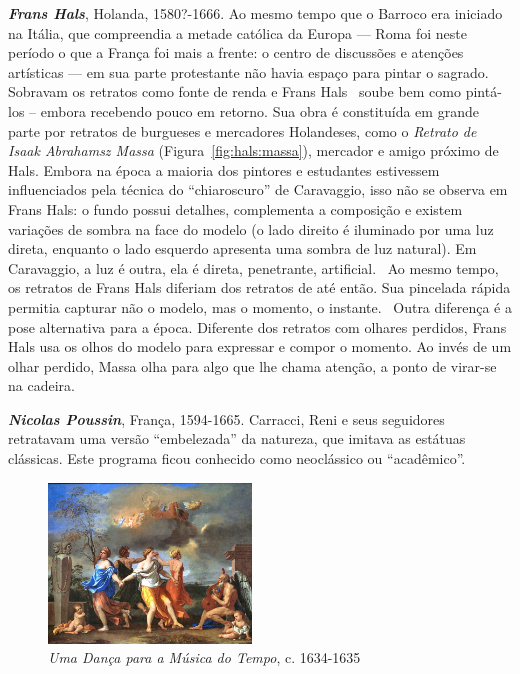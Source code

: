 \textbf{\emph{Frans Hals}}, Holanda, 1580?-1666. Ao mesmo tempo que o Barroco
era iniciado na Itália, que compreendia a metade católica da Europa --- Roma foi
neste período o que a França foi mais a frente: o centro de discussões e
atenções artísticas --- em sua parte protestante não havia espaço para pintar o
sagrado.~\cite{gombrich} Sobravam os retratos como fonte de renda e Frans
Hals~\cite{grimm} soube bem como pintá-los -- embora recebendo pouco em
retorno. Sua obra é constituída em grande parte por retratos de burgueses e
mercadores Holandeses, como o \textit{Retrato de Isaak Abrahamsz Massa}
(Figura~\ref{fig:hals:massa}), mercador e amigo próximo de Hals.  Embora na
época a maioria dos pintores e estudantes estivessem influenciados pela técnica
do ``chiaroscuro'' de Caravaggio, isso não se observa em Frans Hals: o fundo
possui detalhes, complementa a composição e existem variações de sombra na face
do modelo (o lado direito é iluminado por uma luz direta, enquanto o lado
esquerdo apresenta uma sombra de luz natural). Em Caravaggio, a luz é outra, ela
é direta, penetrante, artificial.~\cite{gombrich} Ao mesmo tempo, os retratos de
Frans Hals diferiam dos retratos de até então. Sua pincelada rápida permitia
capturar não o modelo, mas o momento, o instante.~\cite{peter} Outra diferença é
a pose alternativa para a época. Diferente dos retratos com olhares perdidos,
Frans Hals usa os olhos do modelo para expressar e compor o momento. Ao invés de
um olhar perdido, Massa olha para algo que lhe chama atenção, a ponto de
virar-se na cadeira.

\textbf{\emph{Nicolas Poussin}}, França, 1594-1665. Carracci, Reni e seus
seguidores retratavam uma versão ``embelezada'' da natureza, que imitava as
estátuas clássicas. Este programa ficou conhecido como neoclássico ou
``acadêmico''.~\cite{gombrich}

\begin{figure}
  \begin{center}
    \includegraphics[width=0.48\textwidth]{figs/poussin_danca.png}
  \end{center}
  \caption{\emph{Uma Dança para a Música do Tempo}, c. 1634-1635}
  \label{fig:poussin:danca}
\end{figure}

